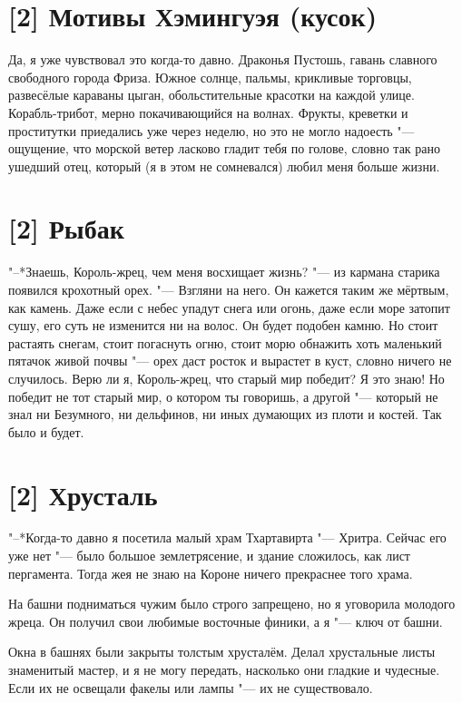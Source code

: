 \section{[2] Мотивы Хэмингуэя (кусок)}

Да, я уже чувствовал это когда-то давно.
Драконья Пустошь, гавань славного свободного города Фриза.
Южное солнце, пальмы, крикливые торговцы, развесёлые караваны цыган, обольстительные красотки на каждой улице.
Корабль-трибот, мерно покачивающийся на волнах.
Фрукты, креветки и проститутки приедались уже через неделю, но это не могло надоесть "--- ощущение, что морской ветер ласково гладит тебя по голове, словно так рано ушедший отец, который (я в этом не сомневался) любил меня больше жизни.

\section{[2] Рыбак}

"--*Знаешь, Король-жрец, чем меня восхищает жизнь? "--- из кармана старика появился крохотный орех.
"--- Взгляни на него.
Он кажется таким же мёртвым, как камень.
Даже если с небес упадут снега или огонь, даже если море затопит сушу, его суть не изменится ни на волос.
Он будет подобен камню.
Но стоит растаять снегам, стоит погаснуть огню, стоит морю обнажить хоть маленький пятачок живой почвы "--- орех даст росток и вырастет в куст, словно ничего не случилось.
Верю ли я, Король-жрец, что старый мир победит?
Я это знаю!
Но победит не тот старый мир, о котором ты говоришь, а другой "--- который не знал ни Безумного, ни дельфинов, ни иных думающих из плоти и костей.
Так было и будет.

\section{[2] Хрусталь}

"--*Когда-то давно я посетила малый храм Тхартавирта "--- Хритра.
Сейчас его уже нет "--- было большое землетрясение, и здание сложилось, как лист пергамента.
Тогда же\ldotst я не знаю на Короне ничего прекраснее того храма.

На башни подниматься чужим было строго запрещено, но я уговорила молодого жреца.
Он получил свои любимые восточные финики, а я "--- ключ от башни.

Окна в башнях были закрыты толстым хрусталём.
Делал хрустальные листы знаменитый мастер, и я не могу передать, насколько они гладкие и чудесные.
Если их не освещали факелы или лампы "--- их не существовало.


